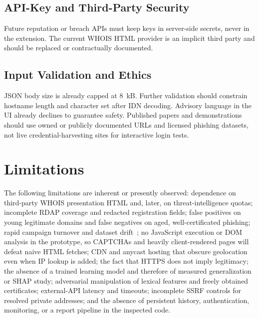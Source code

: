 \documentclass[conference]{IEEEtran}
\begin{document}
\subsection{API-Key and Third-Party Security}
Future reputation or breach APIs must keep keys in server-side secrets, never in the extension. The current WHOIS HTML provider is an implicit third party and should be replaced or contractually documented.

\subsection{Input Validation and Ethics}
JSON body size is already capped at 8~kB. Further validation should constrain hostname length and character set after IDN decoding. Advisory language in the UI already declines to guarantee safety. Published papers and demonstrations should use owned or publicly documented URLs and licensed phishing datasets, not live credential-harvesting sites for interactive login tests.

\section{Limitations}
\label{sec:limit}
The following limitations are inherent or presently observed: dependence on third-party WHOIS presentation HTML and, later, on threat-intelligence quotas; incomplete RDAP coverage and redacted registration fields; false positives on young legitimate domains and false negatives on aged, well-certificated phishing; rapid campaign turnover and dataset drift~\cite{hannousse2021benchmark,apwg2024q4}; no JavaScript execution or DOM analysis in the prototype, so CAPTCHAs and heavily client-rendered pages will defeat naive HTML fetches; CDN and anycast hosting that obscure geolocation even when IP lookup is added; the fact that HTTPS does not imply legitimacy; the absence of a trained learning model and therefore of measured generalization or SHAP study; adversarial manipulation of lexical features and freely obtained certificates; external-API latency and timeouts; incomplete SSRF controls for resolved private addresses; and the absence of persistent history, authentication, monitoring, or a report pipeline in the inspected code.
\end{document}
